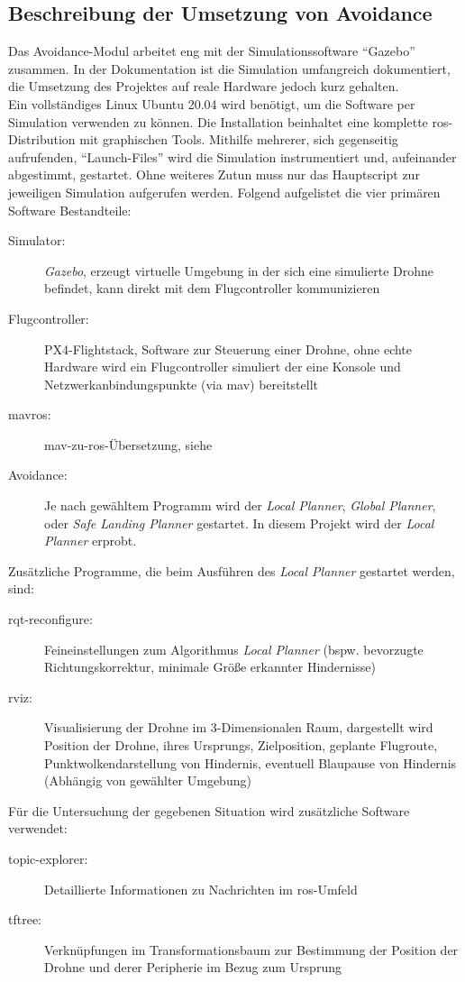 \subsection*{Beschreibung der Umsetzung von Avoidance}
Das Avoidance-Modul arbeitet eng mit der Simulationssoftware \enquote{Gazebo} zusammen. In der Dokumentation \cite{dronecodestiftungObstacleDetectionAvoidance2023} ist die Simulation umfangreich dokumentiert, die Umsetzung des Projektes auf reale Hardware jedoch kurz gehalten.\\
Ein vollständiges Linux Ubuntu 20.04 wird benötigt, um die Software per Simulation verwenden zu können. Die Installation beinhaltet eine komplette \acrshort{ros}-Distribution mit graphischen Tools. Mithilfe mehrerer, sich gegenseitig aufrufenden, \enquote{Launch-Files} wird die Simulation instrumentiert und, aufeinander abgestimmt, gestartet. Ohne weiteres Zutun muss nur das Hauptscript zur jeweiligen Simulation aufgerufen werden. Folgend aufgelistet die vier primären Software Bestandteile:
\begin{description}
    \item[Simulator:] \textit{Gazebo}, erzeugt virtuelle Umgebung in der sich eine simulierte Drohne befindet, kann direkt mit dem Flugcontroller kommunizieren
    \item[Flugcontroller:] PX4-Flightstack, Software zur Steuerung einer Drohne, ohne echte Hardware wird ein Flugcontroller simuliert der eine Konsole und Netzwerkanbindungspunkte (via \acrshort{mav}) bereitstellt
    \item[mavros:] \acrshort{mav}-zu-\acrshort{ros}-Übersetzung, siehe \cite[Kapitel 5.2]{markusreinErweiterungBestehenderDrohnen2023}
    \item[Avoidance:] Je nach gewähltem Programm wird der \textit{Local Planner}, \textit{Global Planner}, oder \textit{Safe Landing Planner} gestartet. In diesem Projekt wird der \textit{Local Planner} erprobt.
\end{description}
Zusätzliche Programme, die beim Ausführen des \textit{Local Planner} gestartet werden, sind:
\begin{description}
    \item[rqt-reconfigure:] Feineinstellungen zum Algorithmus \textit{Local Planner} (bspw. bevorzugte Richtungskorrektur, minimale Größe erkannter Hindernisse)
    \item[rviz:] Visualisierung der Drohne im 3-Dimensionalen Raum, dargestellt wird Position der Drohne, ihres Ursprungs, Zielposition, geplante Flugroute, Punktwolkendarstellung von Hindernis, eventuell Blaupause von Hindernis (Abhängig von gewählter Umgebung)
\end{description}
Für die Untersuchung der gegebenen Situation wird zusätzliche Software verwendet:
\begin{description}
    \item[topic-explorer:] Detaillierte Informationen zu Nachrichten im \acrshort{ros}-Umfeld
    \item[tftree:] Verknüpfungen im Transformationsbaum zur Bestimmung der Position der Drohne und derer Peripherie im Bezug zum Ursprung 
\end{description}

